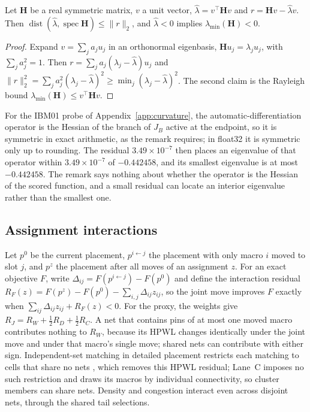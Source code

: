 \begin{appremark}\label{rem:residual}
Let $\mathbf H$ be a real symmetric matrix, $v$ a unit vector,
$\hat\lambda=v^{\top}\mathbf Hv$ and $r=\mathbf Hv-\hat\lambda v$. Then
$\operatorname{dist}(\hat\lambda,\operatorname{spec}\mathbf H)\le\lVert r\rVert_2$, and
$\hat\lambda<0$ implies $\lambda_{\min}(\mathbf H)<0$.
\end{appremark}
\begin{proof}
Expand $v=\sum_ja_ju_j$ in an orthonormal eigenbasis, $\mathbf Hu_j=\lambda_ju_j$,
with $\sum_ja_j^2=1$. Then $r=\sum_ja_j(\lambda_j-\hat\lambda)u_j$ and
$\lVert r\rVert_2^2=\sum_ja_j^2(\lambda_j-\hat\lambda)^2\ge\min_j(\lambda_j-\hat\lambda)^2$.
The second claim is the Rayleigh bound $\lambda_{\min}(\mathbf H)\le v^{\top}\mathbf Hv$.
\end{proof}
For the IBM01 probe of Appendix~\ref{app:curvature}, the automatic-differentiation
operator is the Hessian of the branch of $J_B$ active at the endpoint, so it is
symmetric in exact arithmetic, as the remark requires; in float32 it is symmetric
only up to rounding. The residual $3.49\times10^{-7}$ then places an eigenvalue of
that operator within $3.49\times10^{-7}$ of $-0.442458$, and its smallest eigenvalue
is at most $-0.442458$. The remark says nothing about whether the operator is the Hessian
of the scored function, and a small residual can locate an interior eigenvalue rather
than the smallest one.

\subsection{Assignment interactions}

Let $p^0$ be the current placement, $p^{i\leftarrow j}$ the placement with only macro
$i$ moved to slot $j$, and $p^z$ the placement after all moves of an assignment $z$.
For an exact objective $F$, write $\Delta_{ij}=F(p^{i\leftarrow j})-F(p^0)$ and define
the interaction residual
$R_F(z)=F(p^z)-F(p^0)-\sum_{i,j}\Delta_{ij}z_{ij}$, so the joint move improves $F$
exactly when $\sum_{ij}\Delta_{ij}z_{ij}+R_F(z)<0$. For the proxy, the weights give
$R_J=R_W+\tfrac12R_D+\tfrac12R_C$. A net that
contains pins of at most one moved macro contributes nothing to $R_W$,
because its HPWL changes identically under the joint move and under that macro's
single move; shared nets can contribute with either sign. Independent-set matching
in detailed placement restricts each matching to cells that share no nets
\citep{chen2008ntuplace3}, which removes this HPWL residual; Lane~C imposes no such
restriction and draws its macros by individual connectivity, so cluster members can
share nets. Density and congestion interact even across
disjoint nets, through the shared tail selections.

